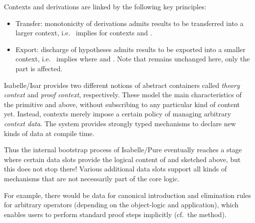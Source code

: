 \begin{isabellebody}
\begin{isamarkuptext}
  \medskip Contexts and derivations are linked by the following key
  principles:

  \begin{itemize}

  \item Transfer: monotonicity of derivations admits results to be
  transferred into a larger context, i.e.\ \isa{{\isasymGamma}\ {\isasymturnstile}\isactrlsub {\isasymTheta}\ {\isasymphi}}
  implies \isa{{\isasymGamma}{\isacharprime}\ {\isasymturnstile}\isactrlsub {\isasymTheta}\isactrlsub {\isacharprime}\ {\isasymphi}} for contexts \isa{{\isasymTheta}{\isacharprime}\ {\isasymsupseteq}\ {\isasymTheta}} and \isa{{\isasymGamma}{\isacharprime}\ {\isasymsupseteq}\ {\isasymGamma}}.

  \item Export: discharge of hypotheses admits results to be exported
  into a smaller context, i.e.\ \isa{{\isasymGamma}{\isacharprime}\ {\isasymturnstile}\isactrlsub {\isasymTheta}\ {\isasymphi}} implies
  \isa{{\isasymGamma}\ {\isasymturnstile}\isactrlsub {\isasymTheta}\ {\isasymDelta}\ {\isasymLongrightarrow}\ {\isasymphi}} where \isa{{\isasymGamma}{\isacharprime}\ {\isasymsupseteq}\ {\isasymGamma}} and \isa{{\isasymDelta}\ {\isacharequal}\ {\isasymGamma}{\isacharprime}\ {\isacharminus}\ {\isasymGamma}}.  Note that \isa{{\isasymTheta}} remains unchanged here, only the
  \isa{{\isasymGamma}} part is affected.

  \end{itemize}

  \medskip Isabelle/Isar provides two different notions of abstract
  containers called \emph{theory context} and \emph{proof context},
  respectively.  These model the main characteristics of the primitive
  \isa{{\isasymTheta}} and \isa{{\isasymGamma}} above, without subscribing to any
  particular kind of content yet.  Instead, contexts merely impose a
  certain policy of managing arbitrary \emph{context data}.  The
  system provides strongly typed mechanisms to declare new kinds of
  data at compile time.

  Thus the internal bootstrap process of Isabelle/Pure eventually
  reaches a stage where certain data slots provide the logical content
  of \isa{{\isasymTheta}} and \isa{{\isasymGamma}} sketched above, but this does not
  stop there!  Various additional data slots support all kinds of
  mechanisms that are not necessarily part of the core logic.

  For example, there would be data for canonical introduction and
  elimination rules for arbitrary operators (depending on the
  object-logic and application), which enables users to perform
  standard proof steps implicitly (cf.\ the  method).


\end{isamarkuptext}
\end{isabellebody}
